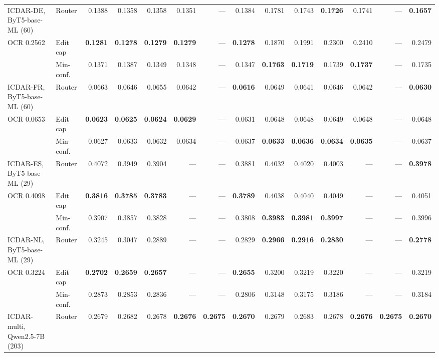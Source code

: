 \begin{tabular}{llrrrrrr@{\hskip 10pt}rrrrrr}
\addlinespace[2pt]
ICDAR-DE, ByT5-base-ML (60) & Router & 0.1388 & 0.1358 & 0.1358 & 0.1351 & — & 0.1384 & 0.1781 & 0.1743 & \textbf{0.1726} & 0.1741 & — & \textbf{0.1657} \\
\quad OCR 0.2562 & Edit cap & \textbf{0.1281} & \textbf{0.1278} & \textbf{0.1279} & \textbf{0.1279} & — & \textbf{0.1278} & 0.1870 & 0.1991 & 0.2300 & 0.2410 & — & 0.2479 \\
 & Min-conf. & 0.1371 & 0.1387 & 0.1349 & 0.1348 & — & 0.1347 & \textbf{0.1763} & \textbf{0.1719} & 0.1739 & \textbf{0.1737} & — & 0.1735 \\
\addlinespace[2pt]
ICDAR-FR, ByT5-base-ML (60) & Router & 0.0663 & 0.0646 & 0.0655 & 0.0642 & — & \textbf{0.0616} & 0.0649 & 0.0641 & 0.0646 & 0.0642 & — & \textbf{0.0630} \\
\quad OCR 0.0653 & Edit cap & \textbf{0.0623} & \textbf{0.0625} & \textbf{0.0624} & \textbf{0.0629} & — & 0.0631 & 0.0648 & 0.0648 & 0.0649 & 0.0648 & — & 0.0648 \\
 & Min-conf. & 0.0627 & 0.0633 & 0.0632 & 0.0634 & — & 0.0637 & \textbf{0.0633} & \textbf{0.0636} & \textbf{0.0634} & \textbf{0.0635} & — & 0.0637 \\
\addlinespace[2pt]
ICDAR-ES, ByT5-base-ML (29) & Router & 0.4072 & 0.3949 & 0.3904 & — & — & 0.3881 & 0.4032 & 0.4020 & 0.4003 & — & — & \textbf{0.3978} \\
\quad OCR 0.4098 & Edit cap & \textbf{0.3816} & \textbf{0.3785} & \textbf{0.3783} & — & — & \textbf{0.3789} & 0.4038 & 0.4040 & 0.4049 & — & — & 0.4051 \\
 & Min-conf. & 0.3907 & 0.3857 & 0.3828 & — & — & 0.3808 & \textbf{0.3983} & \textbf{0.3981} & \textbf{0.3997} & — & — & 0.3996 \\
\addlinespace[2pt]
ICDAR-NL, ByT5-base-ML (29) & Router & 0.3245 & 0.3047 & 0.2889 & — & — & 0.2829 & \textbf{0.2966} & \textbf{0.2916} & \textbf{0.2830} & — & — & \textbf{0.2778} \\
\quad OCR 0.3224 & Edit cap & \textbf{0.2702} & \textbf{0.2659} & \textbf{0.2657} & — & — & \textbf{0.2655} & 0.3200 & 0.3219 & 0.3220 & — & — & 0.3219 \\
 & Min-conf. & 0.2873 & 0.2853 & 0.2836 & — & — & 0.2806 & 0.3148 & 0.3175 & 0.3186 & — & — & 0.3184 \\
\addlinespace[2pt]
ICDAR-multi, Qwen2.5-7B (203) & Router & 0.2679 & 0.2682 & 0.2678 & \textbf{0.2676} & \textbf{0.2675} & \textbf{0.2670} & 0.2679 & 0.2683 & 0.2678 & \textbf{0.2676} & \textbf{0.2675} & \textbf{0.2670} \\

\end{tabular}
